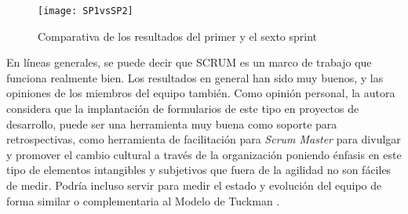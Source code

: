 \begin{figure}[!h]
\begin{center}
\texttt{[image: SP1vsSP2]}
\caption{Comparativa de los resultados del primer y el sexto sprint}
\label{fig:SP1vsSP2}
\end{center}
\end{figure}

En líneas generales, se puede decir que SCRUM es un marco de trabajo que funciona realmente bien. Los resultados en general han sido muy buenos, y las opiniones de los miembros del equipo también. Como opinión personal, la autora considera que la implantación de formularios de este tipo en proyectos de desarrollo, puede ser una herramienta muy buena como soporte para retrospectivas, como herramienta de facilitación para \emph{Scrum Master} para divulgar y promover el cambio cultural a través de la organización poniendo énfasis en este tipo de elementos intangibles y subjetivos que fuera de la agilidad no son fáciles de medir. Podría incluso servir para medir el estado y evolución del equipo de forma similar o complementaria al Modelo de Tuckman \cite{tuckman}.

